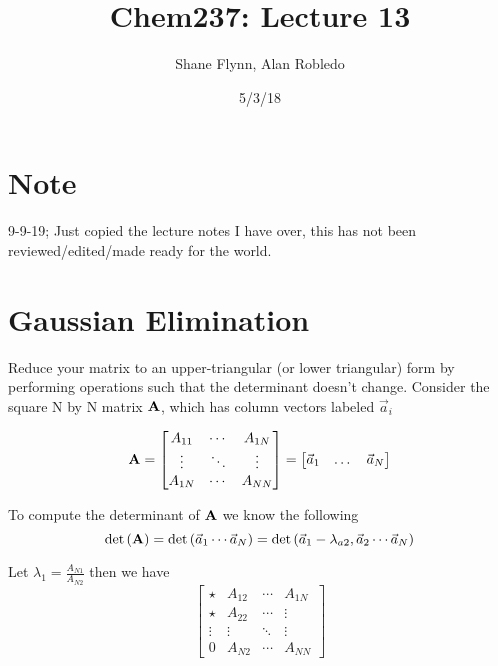\documentclass{article}
\title{Chem237: Lecture 13}
\date{5/3/18}
\author{Shane Flynn, Alan Robledo}
\newcommand{\be}{\begin{equation}}
\newcommand{\ee}{\end{equation}}
\newcommand{\bA}{\mbox{\bf A}}
\begin{document}
\maketitle

\section{Note}
9-9-19; Just copied the lecture notes I have over, this has not been reviewed/edited/made ready for the world.

\section*{Gaussian Elimination}
Reduce your matrix to an upper-triangular (or lower triangular) form by performing operations such that the determinant doesn't change.
%
Consider the square N by N matrix $\bA$, which has column vectors labeled $\vec{a}_i$

\be
\bA =
\begin{bmatrix}
    A_{11}  & \dotsb &  A_{1N} \\
    \vdots  & \ddots &  \vdots \\
    A_{1N}  & \dotsb &  A_{NN}
\end{bmatrix}
    =
\begin{bmatrix}
        \vec{a}_1 & \dots  & \vec{a}_N
\end{bmatrix}
\ee

To compute the determinant of $\bA$ we know the following
\be
\det\left(\bA\right) = \det\left(\vec{a}_1 \cdots  \vec{a}_N \right) = \det\left(\vec{a}_1- \lambda_{a2}, \vec{a}_2 \cdots \vec{a}_N \right)
\ee

Let $\lambda_1 = \frac{A_{N1}}{A_{N2}}$ then we have
\be
\begin{bmatrix}
    \star  & A_{12} & \dotsb &  A_{1N} \\
    \star & A_{22} &\dotsb &  \vdots \\
    \vdots & \vdots &  \ddots &  \vdots \\
    0  & A_{N2} & \dotsb &  A_{NN}
\end{bmatrix}
\ee
\end{document}
